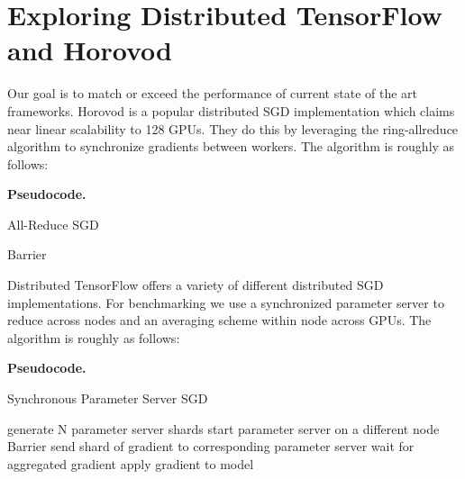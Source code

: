 \section{Exploring Distributed TensorFlow and Horovod}

Our goal is to match or exceed the performance of current state of the art frameworks. Horovod is a popular distributed SGD implementation which claims near linear scalability to 128 GPUs. They do this by leveraging the ring-allreduce algorithm to synchronize gradients between workers. The algorithm is roughly as follows:

\textbf{Pseudocode.}
\begin{algorithm}
\scriptsize
\caption{All-Reduce SGD}
 {
}
Barrier\;

 {
}


 {
}
\end{algorithm}

Distributed TensorFlow offers a variety of different distributed SGD implementations. For benchmarking we use a synchronized parameter server to reduce across nodes and an averaging scheme within node across GPUs. The algorithm is roughly as follows:

\textbf{Pseudocode.}
\begin{algorithm}
\caption{Synchronous Parameter Server SGD}
 {
}
generate N parameter server shards\;
 {
    start parameter server on a different node \;
}
Barrier\;
 {
send shard of gradient to corresponding parameter server \;
wait for aggregated gradient \;
apply gradient to model \;
}
\end{algorithm}

